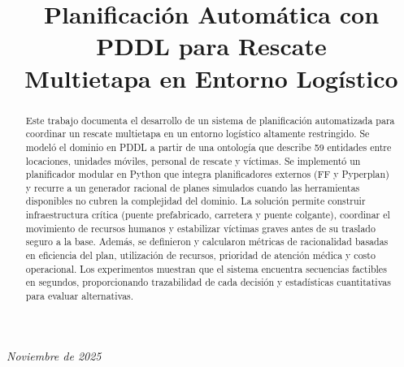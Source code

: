 \documentclass[conference]{IEEEtran}
\newcommand{\paperdate}{Noviembre de 2025}
\begin{document}
    \title{Planificación Automática con PDDL para Rescate\\
    Multietapa en Entorno Logístico}

    \author{
    \vspace{0.9em}
    }

    \maketitle

    \begin{flushright}
    \textit{\paperdate}
    \end{flushright}

    \begin{abstract}
    Este trabajo documenta el desarrollo de un sistema de planificación automatizada para coordinar un rescate multietapa en un entorno logístico altamente restringido. Se modeló el dominio en PDDL a partir de una ontología que describe 59 entidades entre locaciones, unidades móviles, personal de rescate y víctimas. Se implementó un planificador modular en Python que integra planificadores externos (FF y Pyperplan) y recurre a un generador racional de planes simulados cuando las herramientas disponibles no cubren la complejidad del dominio. La solución permite construir infraestructura crítica (puente prefabricado, carretera y puente colgante), coordinar el movimiento de recursos humanos y estabilizar víctimas graves antes de su traslado seguro a la base. Además, se definieron y calcularon métricas de racionalidad basadas en eficiencia del plan, utilización de recursos, prioridad de atención médica y costo operacional. Los experimentos muestran que el sistema encuentra secuencias factibles en segundos, proporcionando trazabilidad de cada decisión y estadísticas cuantitativas para evaluar alternativas.
    \end{abstract}
\end{document}
